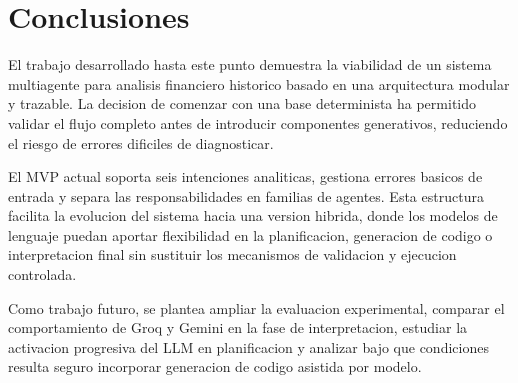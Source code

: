 \chapter{Conclusiones}

El trabajo desarrollado hasta este punto demuestra la viabilidad de un sistema multiagente para analisis financiero historico basado en una arquitectura modular y trazable. La decision de comenzar con una base determinista ha permitido validar el flujo completo antes de introducir componentes generativos, reduciendo el riesgo de errores dificiles de diagnosticar.

El MVP actual soporta seis intenciones analiticas, gestiona errores basicos de entrada y separa las responsabilidades en familias de agentes. Esta estructura facilita la evolucion del sistema hacia una version hibrida, donde los modelos de lenguaje puedan aportar flexibilidad en la planificacion, generacion de codigo o interpretacion final sin sustituir los mecanismos de validacion y ejecucion controlada.

Como trabajo futuro, se plantea ampliar la evaluacion experimental, comparar el comportamiento de Groq y Gemini en la fase de interpretacion, estudiar la activacion progresiva del LLM en planificacion y analizar bajo que condiciones resulta seguro incorporar generacion de codigo asistida por modelo.
